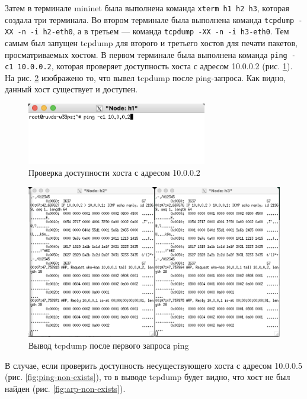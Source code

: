 \documentclass[a4paper, 14pt]{extarticle}
\begin{document}
Затем в терминале mininet была выполнена команда \texttt{xterm h1 h2 h3},
которая создала три терминала. Во втором терминале была выполнена команда
\texttt{tcpdump -XX -n -i h2-eth0}, а в третьем --- команда \texttt{tcpdump -XX
  -n -i h3-eth0}. Тем самым был запущен tcpdump для второго и третьего хостов
для печати пакетов, просматриваемых хостом. В первом терминале была выполнена
команда \texttt{ping -c1 10.0.0.2}, которая проверяет доступность хоста с
адресом 10.0.0.2 (рис. \ref{fig:ping-exists}). На рис. \ref{fig:arp-exists}
изображено то, что вывел tcpdump после ping-запроса. Как видно, данный хост
существует и доступен.

\begin{figure}[H]
  \centering
  \includegraphics[width=0.7\textwidth]{images/ping-exists.png}
  \caption{Проверка доступности хоста с адресом 10.0.0.2}
  \label{fig:ping-exists}
\end{figure}

\begin{figure}[H]
  \centering
  \includegraphics[width=\textwidth]{images/arp-exists.png}
  \caption{Вывод tcpdump после первого запроса ping}
  \label{fig:arp-exists}
\end{figure}

В случае, если проверить доступность несуществующего хоста с адресом 10.0.0.5
(рис. \ref{fig:ping-non-exists}), то в выводе tcpdump будет видно, что хост не
был найден (рис. \ref{fig:arp-non-exists}).
\end{document}
